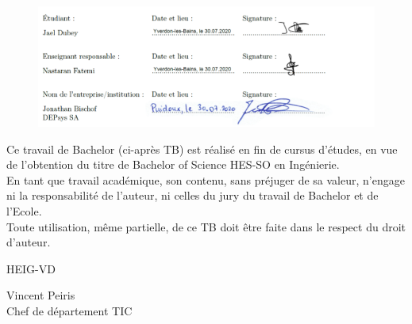 \documentclass[paper=a4, fontsize=11pt]{scrartcl}
\begin{document}
  
  \begin{figure}[H]
    \centering
    \includegraphics[width=18cm]{img/signatures_resume.png}
    \label{f-signatureJaelNastJonathan}
  \end{figure}
  
  
%  
%  
  
\newpage

  
  Ce travail de Bachelor (ci-après TB) est réalisé en fin de cursus d’études, en vue de l'obtention du titre de Bachelor of Science HES-SO en Ingénierie. \\
  
  En tant que travail académique, son contenu, sans préjuger de sa valeur, n'engage ni la responsabilité de l'auteur, ni celles du jury du travail de Bachelor et de l'Ecole. \\
  
  Toute utilisation, même partielle, de ce TB doit être faite dans le respect du droit d’auteur. \\
  
  
  \begin{flushright}
      \begin{minipage}{7cm}
          \vspace{2cm}
          HEIG-VD \\
  
          \vspace{2cm}
  
          Vincent Peiris\\
          Chef de département TIC
      \end{minipage}\hfill
  \end{flushright}
  
\end{document}
